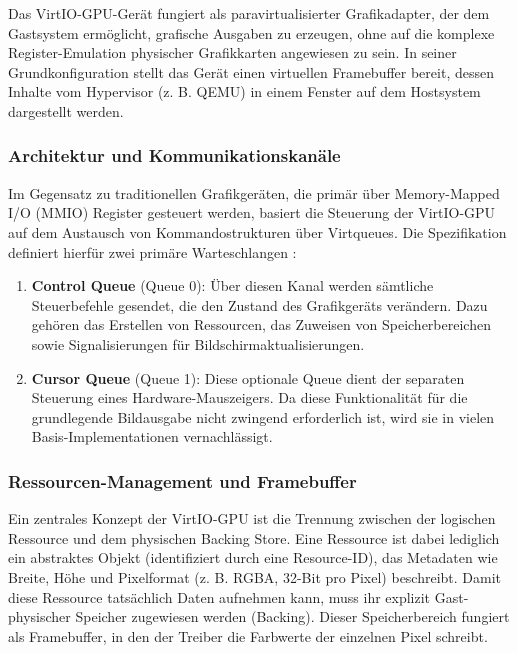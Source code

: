 Das VirtIO-GPU-Gerät fungiert als paravirtualisierter Grafikadapter, der dem Gastsystem ermöglicht, grafische Ausgaben zu erzeugen, ohne auf die komplexe Register-Emulation physischer Grafikkarten angewiesen zu sein. In seiner Grundkonfiguration stellt das Gerät einen virtuellen Framebuffer bereit, dessen Inhalte vom Hypervisor (z. B. QEMU) in einem Fenster auf dem Hostsystem dargestellt werden.

\subsubsection{Architektur und Kommunikationskanäle}

Im Gegensatz zu traditionellen Grafikgeräten, die primär über Memory-Mapped I/O (MMIO) Register gesteuert werden, basiert die Steuerung der VirtIO-GPU auf dem Austausch von Kommandostrukturen über Virtqueues. Die Spezifikation definiert hierfür zwei primäre Warteschlangen \cite[Abschnitt~5.7]{OASISVirtio12}:

\begin{enumerate}
 \item \textbf{Control Queue} (Queue 0): Über diesen Kanal werden sämtliche Steuerbefehle gesendet, die den Zustand des Grafikgeräts verändern. Dazu gehören das Erstellen von Ressourcen, das Zuweisen von Speicherbereichen sowie Signalisierungen für Bildschirmaktualisierungen.
 \item \textbf{Cursor Queue} (Queue 1): Diese optionale Queue dient der separaten Steuerung eines Hardware-Mauszeigers. Da diese Funktionalität für die grundlegende Bildausgabe nicht zwingend erforderlich ist, wird sie in vielen Basis-Implementationen vernachlässigt.
\end{enumerate}

\subsubsection{Ressourcen-Management und Framebuffer}

Ein zentrales Konzept der VirtIO-GPU ist die Trennung zwischen der logischen Ressource und dem physischen Backing Store. Eine Ressource ist dabei lediglich ein abstraktes Objekt (identifiziert durch eine Resource-ID), das Metadaten wie Breite, Höhe und Pixelformat (z. B. RGBA, 32-Bit pro Pixel) beschreibt. Damit diese Ressource tatsächlich Daten aufnehmen kann, muss ihr explizit Gast-physischer Speicher zugewiesen werden (Backing). Dieser Speicherbereich fungiert als Framebuffer, in den der Treiber die Farbwerte der einzelnen Pixel schreibt.

